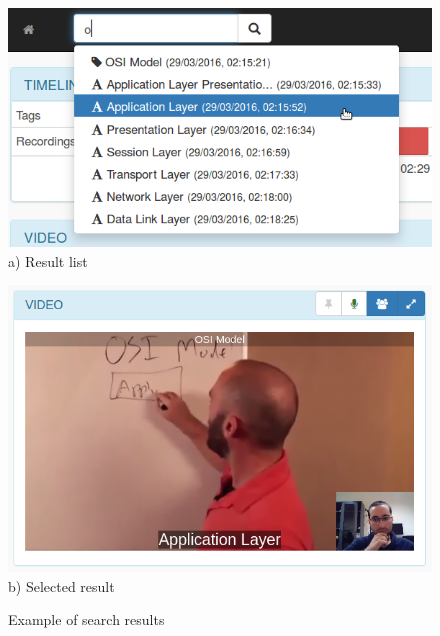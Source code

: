 \begin{figure}[!htb]
\centering
\begin{minipage}[b]{0.55\linewidth}
\centering

		\includegraphics[width=\textwidth]{figures/search.png}
	      a) Result list
\label{fig:minipage1}
\end{minipage}
\quad
\begin{minipage}[b]{0.40\linewidth}
		\centering

		\includegraphics[width=\textwidth]{figures/search2.png}
	       b) Selected result
\label{fig:minipage2}
\end{minipage}

		\caption{Example of search results}
		\label{fig:search}
\end{figure}

